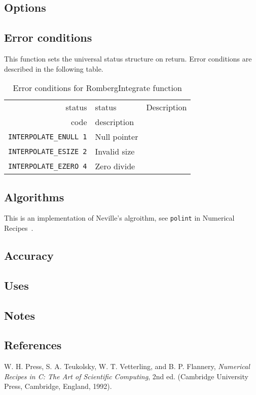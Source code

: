 \documentclass{article}
\begin{document}
\subsection{Options}

\subsection{Error conditions}

This function sets the universal status structure on return.
Error conditions are described in the following table.

\begin{table}
\begin{tabular}{|r|l|p{2in}|}\hline
status  & status          & Description\\
code    & description     & \\\hline
\verb+INTERPOLATE_ENULL 1+ & Null pointer & \\
\verb+INTERPOLATE_ESIZE 2+ & Invalid size  & \\
\verb+INTERPOLATE_EZERO 4+ & Zero divide & \\
\hline
\end{tabular}
\caption{Error conditions for RombergIntegrate function}\label{tbl:CV}
\end{table}

\subsection{Algorithms}

This is an implementation of Neville's algroithm, see \verb+polint+ in
Numerical Recipes~\cite{ptvf:1992}.

\subsection{Accuracy}

\subsection{Uses}

\subsection{Notes}

\subsection{References}
\begin{thebibliography}{0}
  W. H. Press, S. A. Teukolsky, W. T. Vetterling, and B. P. Flannery,
  \textit{Numerical Recipes in C: The Art of Scientific Computing}, 2nd ed.
  (Cambridge University Press, Cambridge, England, 1992).
\end{thebibliography}
\end{document}
